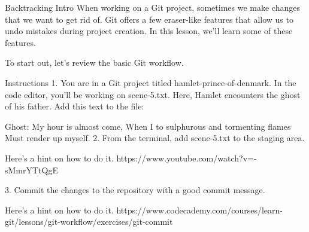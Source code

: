 Backtracking Intro
    When working on a Git project, sometimes we make changes that we want to get rid of. Git offers a few eraser-like features that allow us to undo mistakes during project creation. In this lesson, we’ll learn some of these features.

    To start out, let’s review the basic Git workflow.

Instructions
    1.
    You are in a Git project titled hamlet-prince-of-denmark. In the code editor, you’ll be working on scene-5.txt. Here, Hamlet encounters the ghost of his father. Add this text to the file:

        Ghost: 
        My hour is almost come,
        When I to sulphurous and tormenting flames
        Must render up myself.
    2.
    From the terminal, add scene-5.txt to the staging area.

    Here’s a hint on how to do it.
        https://www.youtube.com/watch?v=-sMmrYTtQgE

    3.
    Commit the changes to the repository with a good commit message.

    Here’s a hint on how to do it.
        https://www.codecademy.com/courses/learn-git/lessons/git-workflow/exercises/git-commit